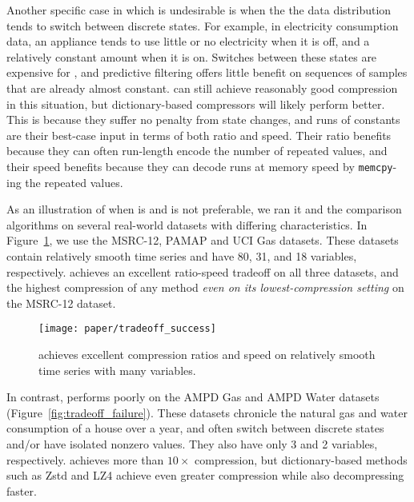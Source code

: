 Another specific case in which \minesp is undesirable is when the the data distribution tends to switch between discrete states. For example, in electricity consumption data, an appliance tends to use little or no electricity when it is off, and a relatively constant amount when it is on. Switches between these states are expensive for \mine, and predictive filtering offers little benefit on sequences of samples that are already almost constant. \minesp can still achieve reasonably good compression in this situation, but dictionary-based compressors will likely perform better. This is because they suffer no penalty from state changes, and runs of constants are their best-case input in terms of both ratio and speed. Their ratio benefits because they can often run-length encode the number of repeated values, and their speed benefits because they can decode runs at memory speed by \texttt{memcpy}-ing the repeated values.

As an illustration of when \minesp is and is not preferable, we ran it and the comparison algorithms on several real-world datasets with differing characteristics. In Figure~\ref{fig:tradeoff_success}, we use the MSRC-12, PAMAP and UCI Gas datasets. These datasets contain relatively smooth time series and have 80, 31, and 18 variables, respectively. \minesp achieves an excellent ratio-speed tradeoff on all three datasets, and the highest compression of any method \textit{even on its lowest-compression setting} on the MSRC-12 dataset.

\begin{figure}[h]
\begin{center}
    \texttt{[image: paper/tradeoff\_success]}
    \caption{\minesp achieves excellent compression ratios and speed on relatively smooth time series with many variables.}
    \label{fig:tradeoff_success}
\end{center}
\end{figure}

In contrast, \minesp performs poorly on the AMPD Gas and AMPD Water datasets (Figure~\ref{fig:tradeoff_failure}). These datasets chronicle the natural gas and water consumption of a house over a year, and often switch between discrete states and/or have isolated nonzero values. They also have only 3 and 2 variables, respectively. \minesp achieves more than $10\times$ compression, but dictionary-based methods such as Zstd and LZ4 achieve even greater compression while also decompressing faster.


